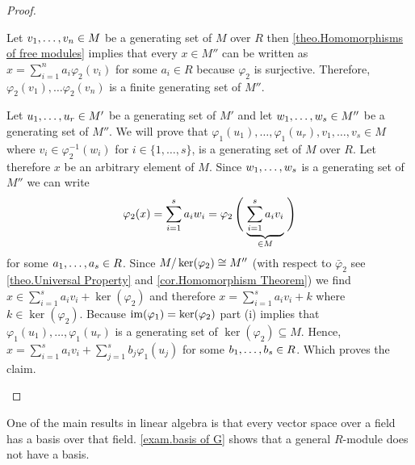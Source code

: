 \begin{proof}
\begin{plist}
\item Let $\seq{v}\in M$ be a generating set of $M$ over $R$ then \cref{theo.Homomorphisms of free modules} implies that every $x\in M''$ can be written as $x=\sum_{i=1}^n a_i\varphi_2(v_i)$ for some $a_i\in R$ because $\varphi_2$ is surjective. Therefore, $\varphi_2(v_1),\ldots\varphi_2(v_n)$ is a finite generating set of $M''$.
\item Let $\seq[r]{u}\in M'$ be a generating set of $M'$ and let $\seq[s]{w}\in M''$ be a generating set of $M''$.
We will prove that $\varphi_1(u_1),\ldots,\varphi_1(u_r),v_1,\ldots,v_s\in M$ where $v_i\in\varphi_2^{-1}(w_i)$ for $i\in\lbrace 1,\ldots,s\rbrace$, is a generating set of $M$ over $R$.
Let therefore $x$ be an arbitrary element of $M$.
Since $\seq[s]{w}$ is a generating set of $M''$ we can write 
\begin{equation*}
\varphi_2(x)=\sum_{i=1}^s a_i w_i=\varphi_2\left(\vphantom{\sum_{i=1}^s}\right.
\underbrace{\sum_{i=1}^s a_i v_i}_{\in M}
\left. \vphantom{\sum_{i=1}^s}\right)
\end{equation*}
for some $\seq[s]{a}\in R$. Since $\nicefrac{M}{\ker(\varphi_2)}\cong M''$ (with respect to $\bar{\varphi}_2$ see \cref{theo.Universal Property} and \cref{cor.Homomorphism Theorem}) we find $x\in \sum_{i=1}^s a_i v_i+\ker(\varphi_2)$ and therefore $x=\sum_{i=1}^s a_i v_i+k$ where $k\in\ker(\varphi_2)$. Because $\im(\varphi_1)=\ker(\varphi_2)$ part (i) implies that $\varphi_1(u_1),\ldots,\varphi_1(u_r)$ is a generating set of $\ker(\varphi_2)\subseteq M$. Hence, $x=\sum_{i=1}^s a_i v_i+\sum_{j=1}^s b_j \varphi_1(u_j)$ for some $\seq[s]{b}\in R$. Which proves the claim.
\end{plist}
\end{proof}

One of the main results in linear algebra is that every vector space over a field has a basis over that field. \cref{exam.basis of G} shows that a general $R$-module does not have a basis.

